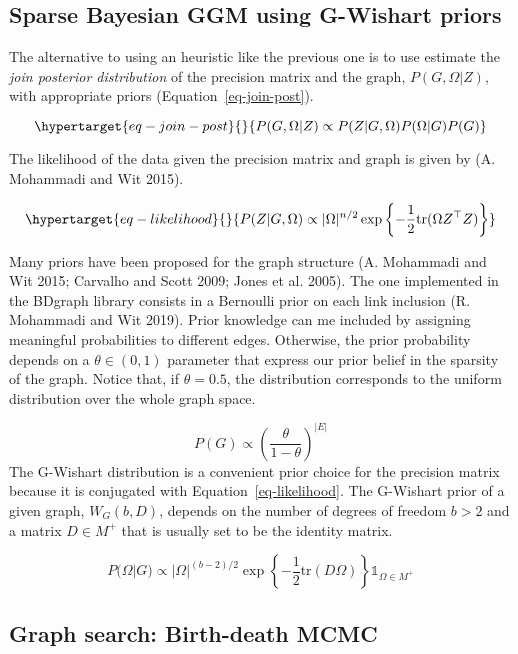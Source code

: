 \documentclass[
  letterpaper,
  DIV=11,
  numbers=noendperiod]{scrartcl}
\begin{document}
\hypertarget{sparse-bayesian-ggm-using-g-wishart-priors}{%
\subsection{Sparse Bayesian GGM using G-Wishart
priors}\label{sparse-bayesian-ggm-using-g-wishart-priors}}

The alternative to using an heuristic like the previous one is to use
estimate the \emph{join posterior distribution} of the precision matrix
and the graph, \(P(G, \Omega|Z)\), with appropriate priors
(Equation~\ref{eq-join-post}).

\begin{equation}\protect\hypertarget{eq-join-post}{}{
P(G, \Omega|Z) \propto P(Z|G, \Omega) P(\Omega|G)P(G)
}\label{eq-join-post}\end{equation}

The likelihood of the data given the precision matrix and graph is given
by (A. Mohammadi and Wit 2015).

\begin{equation}\protect\hypertarget{eq-likelihood}{}{
P(Z|G, \Omega) \propto |\Omega|^{n/2}\exp\left \{ -\frac 1 2 \text{tr}(\Omega Z^\top Z) \right\}
}\label{eq-likelihood}\end{equation}

Many priors have been proposed for the graph structure (A. Mohammadi and
Wit 2015; Carvalho and Scott 2009; Jones et al. 2005). The one
implemented in the BDgraph library consists in a Bernoulli prior on each
link inclusion (R. Mohammadi and Wit 2019). Prior knowledge can me
included by assigning meaningful probabilities to different edges.
Otherwise, the prior probability depends on a \(\theta \in (0, 1)\)
parameter that express our prior belief in the sparsity of the graph.
Notice that, if \(\theta = 0.5\), the distribution corresponds to the
uniform distribution over the whole graph space.

\[
P(G) \propto \left ( \frac{\theta}{1-\theta}\right) ^{|E|}
\]The G-Wishart distribution is a convenient prior choice for the
precision matrix because it is conjugated with
Equation~\ref{eq-likelihood}. The G-Wishart prior of a given graph,
\(W_G(b, D)\), depends on the number of degrees of freedom \(b>2\) and a
matrix \(D\in M^+\) that is usually set to be the identity matrix.

\[
P(\Omega|G) \propto |\Omega|^{(b-2)/2} \exp\left \{ -\frac 1 2 \text{tr}(D\Omega)  \right\} \mathbb 1_{\Omega\in M ^+}
\]

\hypertarget{graph-search-birth-death-mcmc}{%
\subsection{Graph search: Birth-death
MCMC}\label{graph-search-birth-death-mcmc}}
\end{document}
